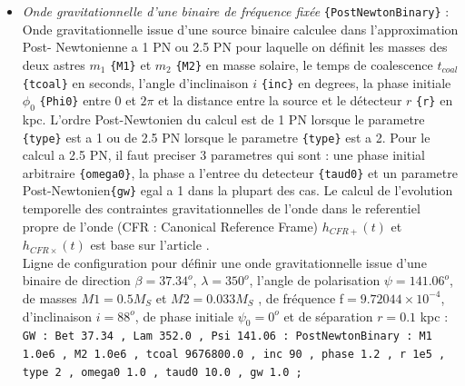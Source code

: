 \documentclass[a4paper,english,12pt]{article}
\begin{document}
\begin{itemize}
\item { \it Onde gravitationnelle d'une binaire de fréquence fixée } \texttt{\{PostNewtonBinary\}} : Onde gravitationnelle issue d'une source binaire calculee dans l'approximation Post- Newtonienne a 1 PN ou 2.5 PN  pour laquelle on d\'efinit les masses des deux astres $m_{1}$ \texttt{\{M1\}} et $m_{2}$ \texttt{\{M2\}} en masse solaire, le temps de coalescence  $t_{coal}$ \texttt{\{tcoal\}} en seconds, l'angle d'inclinaison $i$ \texttt{\{inc\}} en degrees, la phase initiale $\phi_{0}$ \texttt{\{Phi0\}} entre $0$ et $2\pi$ et la distance entre la source et le d\'etecteur $r$ \texttt{\{r\}} en kpc. L'ordre Post-Newtonien du calcul est de 1 PN lorsque le parametre \texttt{\{type\}} est a 1 ou de 2.5 PN lorsque le parametre \texttt{\{type\}} est a 2. Pour le calcul a 2.5 PN, il faut preciser 3 parametres qui sont : une phase initial arbitraire \texttt{\{omega0\}}, la phase a l'entree du detecteur \texttt{\{taud0\}} et un parametre Post-Newtonien\texttt{\{gw\}}  egal a 1 dans la plupart des cas. Le calcul de l'evolution temporelle des contraintes gravitationnelles de l'onde dans le referentiel propre de l'onde (CFR : Canonical Reference Frame) ${h}_{CFR+} (t)$ et ${h}_{CFR\times} (t)$ est base sur l'article \cite{2PN_1,2PN_2,2PN_3,2PN_4}. \\
Ligne de configuration pour d\'efinir une onde gravitationnelle issue d'une binaire de direction $\beta = 37.34^{o}$, $\lambda= 350^{o}$, l’angle de polarisation $\psi = 141.06^{o}$, de masses $M1 = 0.5 M_S$ et $M2 = 0.033 M_S$ , de fr\'equence f$ = 9.72044 \times 10^{-4}$, d'inclinaison $i = 88^{o}$, de phase initiale $\psi_0 = 0^{o}$ et de s\'eparation $r = 0.1$ kpc : \\
\hphantom{aaaaa}\texttt{GW : Bet 37.34 , Lam 352.0 , Psi 141.06  : PostNewtonBinary : M1 1.0e6 , M2 1.0e6 , tcoal 9676800.0 , inc 90 , phase 1.2 , r 1e5 , type 2 , omega0 1.0 , taud0 10.0 , gw 1.0 ;}  \\


\end{itemize}
\end{document}

